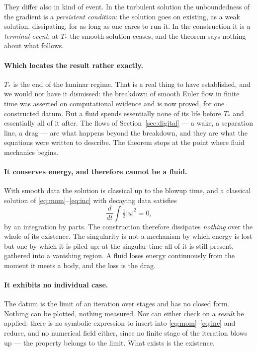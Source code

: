 \documentclass[11pt]{article}
\begin{document}
They differ also in kind of event. In the turbulent solution the unboundedness of the gradient is a
\emph{persistent condition}: the solution goes on existing, as a weak solution, dissipating, for as
long as one cares to run it. In the construction it is a \emph{terminal event}: at $T_*$ the smooth
solution ceases, and the theorem says nothing about what follows.

\paragraph{Which locates the result rather exactly.} $T_*$ is the end of the laminar regime. That is
a real thing to have established, and we would not have it dismissed: the breakdown of smooth Euler
flow in finite time was asserted on computational evidence and is now proved, for one constructed
datum. But a fluid spends essentially none of its life before $T_*$ and essentially all of it
after. The flows of Section~\ref{sec:digital} --- a wake, a separation line, a drag --- are what
happens beyond the breakdown, and they are what the equations were written to describe. The theorem
stops at the point where fluid mechanics begins.

\paragraph{It conserves energy, and therefore cannot be a fluid.} With smooth data the solution is
classical up to the blowup time, and a classical solution of \eqref{eq:mom}--\eqref{eq:inc} with
decaying data satisfies
\[
\frac{d}{dt}\int \tfrac12 |u|^2 = 0 ,
\]
by an integration by parts. The construction therefore dissipates \emph{nothing} over the whole of
its existence. The singularity is not a mechanism by which energy is lost but one by which it is
piled up: at the singular time all of it is still present, gathered into a vanishing region. A fluid
loses energy continuously from the moment it meets a body, and the loss is the drag.

\paragraph{It exhibits no individual case.} The datum is the limit of an iteration over stages and
has no closed form. Nothing can be plotted, nothing measured. Nor can either check on a \emph{result}
be applied: there is no symbolic expression to insert into
\eqref{eq:mom}--\eqref{eq:inc} and reduce, and no numerical field either, since no finite stage of
the iteration blows up --- the property belongs to the limit. What exists is the existence.
\end{document}
